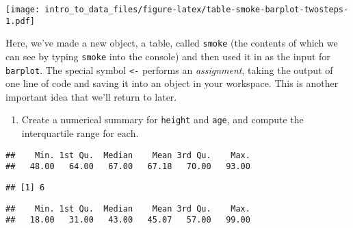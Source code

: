 \documentclass[]{article}
\newenvironment{Shaded}{\begin{snugshade}}{\end{snugshade}}
\newcommand{\KeywordTok}[1]{\textcolor[rgb]{0.13,0.29,0.53}{\textbf{#1}}}
\newcommand{\DecValTok}[1]{\textcolor[rgb]{0.00,0.00,0.81}{#1}}
\newcommand{\CommentTok}[1]{\textcolor[rgb]{0.56,0.35,0.01}{\textit{#1}}}
\newcommand{\OperatorTok}[1]{\textcolor[rgb]{0.81,0.36,0.00}{\textbf{#1}}}
\newcommand{\NormalTok}[1]{#1}
\providecommand{\tightlist}{%
  \setlength{\itemsep}{0pt}\setlength{\parskip}{0pt}}
\begin{document}
\texttt{[image: intro\_to\_data\_files/figure-latex/table-smoke-barplot-twosteps-1.pdf]}

Here, we've made a new object, a table, called \texttt{smoke} (the
contents of which we can see by typing \texttt{smoke} into the console)
and then used it in as the input for \texttt{barplot}. The special
symbol \texttt{\textless{}-} performs an \emph{assignment}, taking the
output of one line of code and saving it into an object in your
workspace. This is another important idea that we'll return to later.

\begin{enumerate}
\def\labelenumi{\arabic{enumi}.}
\setcounter{enumi}{1}
\tightlist
\item
  Create a numerical summary for \texttt{height} and \texttt{age}, and
  compute the interquartile range for each.
\end{enumerate}

\begin{Shaded}
\end{Shaded}

\begin{verbatim}
##    Min. 1st Qu.  Median    Mean 3rd Qu.    Max. 
##   48.00   64.00   67.00   67.18   70.00   93.00
\end{verbatim}

\begin{Shaded}
\end{Shaded}

\begin{verbatim}
## [1] 6
\end{verbatim}

\begin{Shaded}
\end{Shaded}

\begin{verbatim}
##    Min. 1st Qu.  Median    Mean 3rd Qu.    Max. 
##   18.00   31.00   43.00   45.07   57.00   99.00
\end{verbatim}
\end{document}
